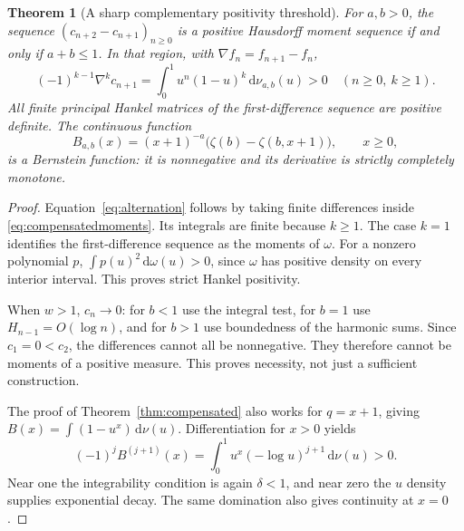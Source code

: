 \documentclass[11pt]{article}
\numberwithin{equation}{section}
\newtheorem{theorem}{Theorem}[section]
\theoremstyle{definition}
\theoremstyle{remark}
\newcommand{\dd}{\,\mathrm d}
\begin{document}
\begin{theorem}[A sharp complementary positivity threshold]
\label{thm:alternation}
For $a,b>0$, the sequence $(c_{n+2}-c_{n+1})_{n\ge0}$ is a positive
Hausdorff moment sequence if and only if $a+b\le1$. In that region,
with $\nabla f_n=f_{n+1}-f_n$,
\begin{equation}\label{eq:alternation}
 (-1)^{k-1}\nabla^k c_{n+1}
 =\int_0^1u^n(1-u)^k\dd\nu_{a,b}(u)>0
 \quad(n\ge0,\ k\ge1).
\end{equation}
All finite principal Hankel matrices of the first-difference sequence
are positive definite. The continuous function
\begin{equation}\label{eq:Bernstein}
 B_{a,b}(x)=(x+1)^{-a}\bigl(\zeta(b)-\zeta(b,x+1)\bigr),\qquad x\ge0,
\end{equation}
is a Bernstein function: it is nonnegative and its derivative is
strictly completely monotone.
\end{theorem}
\begin{proof}
Equation~\eqref{eq:alternation} follows by taking finite differences
inside \eqref{eq:compensatedmoments}. Its integrals are finite because
$k\ge1$. The case $k=1$ identifies the first-difference sequence as
the moments of $\omega$. For a nonzero polynomial $p$,
$\int p(u)^2\dd\omega(u)>0$, since $\omega$ has positive density on
every interior interval. This proves strict Hankel positivity.

When $w>1$, $c_n\to0$: for $b<1$ use the integral test, for $b=1$
use $H_{n-1}=O(\log n)$, and for $b>1$ use boundedness of the harmonic
sums. Since $c_1=0<c_2$, the differences cannot all be nonnegative.
They therefore cannot be moments of a positive measure. This proves
necessity, not just a sufficient construction.

The proof of Theorem~\ref{thm:compensated} also works for $q=x+1$,
giving $B(x)=\int(1-u^x)\dd\nu(u)$. Differentiation for $x>0$ yields
\[
 (-1)^j B^{(j+1)}(x)
 =\int_0^1u^x(-\log u)^{j+1}\dd\nu(u)>0.
\]
Near one the integrability condition is again $\delta<1$, and near
zero the $u$ density supplies exponential decay. The same domination
also gives continuity at $x=0$.
\end{proof}
\end{document}
